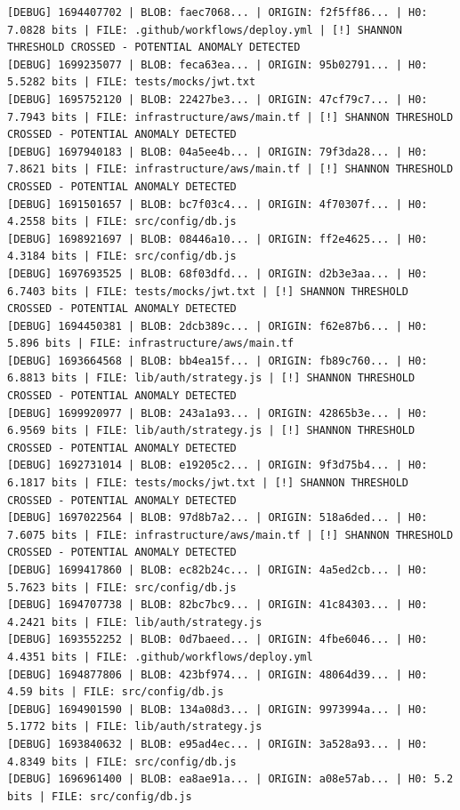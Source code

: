 \documentclass[12pt, a4paper, oneside]{report}
\begin{document}
\begin{lstlisting}[basicstyle=\tiny\ttfamily]
[DEBUG] 1694407702 | BLOB: faec7068... | ORIGIN: f2f5ff86... | H0: 7.0828 bits | FILE: .github/workflows/deploy.yml | [!] SHANNON THRESHOLD CROSSED - POTENTIAL ANOMALY DETECTED
[DEBUG] 1699235077 | BLOB: feca63ea... | ORIGIN: 95b02791... | H0: 5.5282 bits | FILE: tests/mocks/jwt.txt
[DEBUG] 1695752120 | BLOB: 22427be3... | ORIGIN: 47cf79c7... | H0: 7.7943 bits | FILE: infrastructure/aws/main.tf | [!] SHANNON THRESHOLD CROSSED - POTENTIAL ANOMALY DETECTED
[DEBUG] 1697940183 | BLOB: 04a5ee4b... | ORIGIN: 79f3da28... | H0: 7.8621 bits | FILE: infrastructure/aws/main.tf | [!] SHANNON THRESHOLD CROSSED - POTENTIAL ANOMALY DETECTED
[DEBUG] 1691501657 | BLOB: bc7f03c4... | ORIGIN: 4f70307f... | H0: 4.2558 bits | FILE: src/config/db.js
[DEBUG] 1698921697 | BLOB: 08446a10... | ORIGIN: ff2e4625... | H0: 4.3184 bits | FILE: src/config/db.js
[DEBUG] 1697693525 | BLOB: 68f03dfd... | ORIGIN: d2b3e3aa... | H0: 6.7403 bits | FILE: tests/mocks/jwt.txt | [!] SHANNON THRESHOLD CROSSED - POTENTIAL ANOMALY DETECTED
[DEBUG] 1694450381 | BLOB: 2dcb389c... | ORIGIN: f62e87b6... | H0: 5.896 bits | FILE: infrastructure/aws/main.tf
[DEBUG] 1693664568 | BLOB: bb4ea15f... | ORIGIN: fb89c760... | H0: 6.8813 bits | FILE: lib/auth/strategy.js | [!] SHANNON THRESHOLD CROSSED - POTENTIAL ANOMALY DETECTED
[DEBUG] 1699920977 | BLOB: 243a1a93... | ORIGIN: 42865b3e... | H0: 6.9569 bits | FILE: lib/auth/strategy.js | [!] SHANNON THRESHOLD CROSSED - POTENTIAL ANOMALY DETECTED
[DEBUG] 1692731014 | BLOB: e19205c2... | ORIGIN: 9f3d75b4... | H0: 6.1817 bits | FILE: tests/mocks/jwt.txt | [!] SHANNON THRESHOLD CROSSED - POTENTIAL ANOMALY DETECTED
[DEBUG] 1697022564 | BLOB: 97d8b7a2... | ORIGIN: 518a6ded... | H0: 7.6075 bits | FILE: infrastructure/aws/main.tf | [!] SHANNON THRESHOLD CROSSED - POTENTIAL ANOMALY DETECTED
[DEBUG] 1699417860 | BLOB: ec82b24c... | ORIGIN: 4a5ed2cb... | H0: 5.7623 bits | FILE: src/config/db.js
[DEBUG] 1694707738 | BLOB: 82bc7bc9... | ORIGIN: 41c84303... | H0: 4.2421 bits | FILE: lib/auth/strategy.js
[DEBUG] 1693552252 | BLOB: 0d7baeed... | ORIGIN: 4fbe6046... | H0: 4.4351 bits | FILE: .github/workflows/deploy.yml
[DEBUG] 1694877806 | BLOB: 423bf974... | ORIGIN: 48064d39... | H0: 4.59 bits | FILE: src/config/db.js
[DEBUG] 1694901590 | BLOB: 134a08d3... | ORIGIN: 9973994a... | H0: 5.1772 bits | FILE: lib/auth/strategy.js
[DEBUG] 1693840632 | BLOB: e95ad4ec... | ORIGIN: 3a528a93... | H0: 4.8349 bits | FILE: src/config/db.js
[DEBUG] 1696961400 | BLOB: ea8ae91a... | ORIGIN: a08e57ab... | H0: 5.2 bits | FILE: src/config/db.js

\end{lstlisting}
\end{document}
